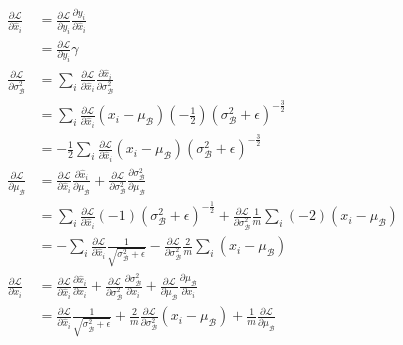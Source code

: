 \documentclass[10pt,onecolumn]{book}
\begin{document}
\begin{equation}
\begin{split}
\frac{\partial \mathcal{L}}{\partial \hat{x}_i} & = \frac{\partial \mathcal{L}}{\partial y_i}  \frac{\partial y_i}{\partial \hat{x}_i} \\
&= \frac{\partial \mathcal{L}}{\partial y_i} \gamma 
\\
\frac{\partial \mathcal{L}}{\partial \sigma^2_\mathcal{B}} &= \sum_i \frac{\partial \mathcal{L}}{\partial \hat{x}_i}  \frac{\partial \hat{x}_i}{\partial \sigma^2_\mathcal{B}} \\
&= \sum_i \frac{\partial \mathcal{L}}{\partial \hat{x}_i} (x_i - \mu_\mathcal{B}) (-\frac{1}{2}) (\sigma^2_\mathcal{B} + \epsilon)^{-\frac{3}{2}} \\
&=-\frac{1}{2} \sum_i \frac{\partial \mathcal{L}}{\partial \hat{x}_i} (x_i - \mu_\mathcal{B}) (\sigma^2_\mathcal{B} + \epsilon)^{-\frac{3}{2}} 
\\
\frac{\partial \mathcal{L}}{\partial \mu_\mathcal{B}} &= \frac{\partial \mathcal{L}}{\partial \hat{x}_i} \frac{\partial \hat{x}_i}{\partial \mu_\mathcal{B}} + \frac{\partial \mathcal{L}}{\partial \sigma^2_\mathcal{B}} \frac{\partial \sigma^2_\mathcal{B}}{\partial \mu_\mathcal{B}} \\
&= \sum_i \frac{\partial \mathcal{L}}{\partial \hat{x}_i}(-1)(\sigma^2_\mathcal{B} + \epsilon)^{-\frac{1}{2}} + \frac{\partial \mathcal{L}}{\partial \sigma^2_\mathcal{B}}\frac{1}{m}\sum_i (-2) (x_i - \mu_\mathcal{B}) \\
&= -\sum_i \frac{\partial \mathcal{L}}{\partial \hat{x}_i}\frac{1}{\sqrt{\sigma^2_\mathcal{B} + \epsilon}} - \frac{\partial \mathcal{L}}{\partial \sigma^2_\mathcal{B}}\frac{2}{m}\sum_i(x_i - \mu_\mathcal{B})
\\
\frac{\partial \mathcal{L}}{\partial x_i} &= \frac{\partial \mathcal{L}}{\partial \hat{x}_i} \frac{\partial \hat{x}_i}{\partial x_i} + \frac{\partial \mathcal{L}}{\partial \sigma^2_\mathcal{B}} \frac{\partial \sigma^2_\mathcal{B}}{\partial x_i}+ \frac{\partial \mathcal{L}}{\partial \mu_\mathcal{B}} \frac{\partial \mu_\mathcal{B}}{\partial x_i} \\
&= \frac{\partial \mathcal{L}}{\partial \hat{x}_i} \frac{1}{\sqrt{\sigma^2_\mathcal{B} + \epsilon}} + \frac{2}{m} \frac{\partial \mathcal{L}}{\partial \sigma^2_\mathcal{B}} (x_i - \mu_\mathcal{B}) + \frac{1}{m} \frac{\partial \mathcal{L}}{\partial \mu_\mathcal{B}}
\\
\end{split}
\end{equation}
\end{document}
